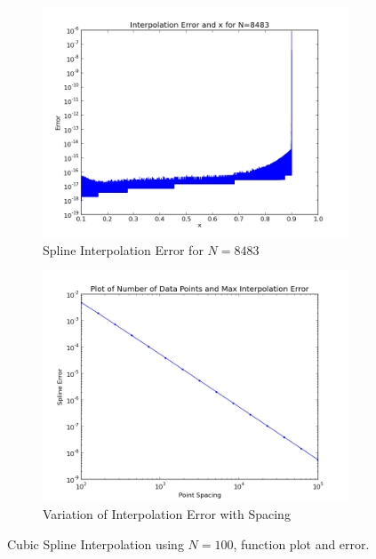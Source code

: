 \documentclass[11pt]{article}
\begin{document}
\begin{figure}
        \centering
        \begin{subfigure}{.5\textwidth}
  \centering
        \includegraphics[width=\linewidth]{q4/err_high.png}
                \caption{Spline Interpolation Error for $N=8483$}
                \label{fig:q4_2_err}
                \end{subfigure}%
\begin{subfigure}{.5\textwidth}
  \centering
        \includegraphics[width=\linewidth]{q4/loglogerr.png}
                \caption{Variation of Interpolation Error with Spacing}
                \label{fig:q4_2_loglog}
	\end{subfigure}
            
\caption{Cubic Spline Interpolation using $N=100$, function plot and error. }
\label{fig:q4_2}            
\end{figure}
\end{document}
